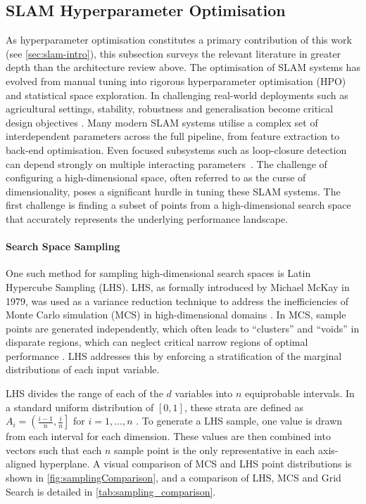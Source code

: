 \subsection{SLAM Hyperparameter Optimisation}
\label{subsec:slam-hyperparameter}
As hyperparameter optimisation constitutes a primary contribution of this work (see \cref{sec:slam-intro}), this subsection surveys the relevant literature in greater depth than the architecture review above.
The optimisation of SLAM systems has evolved from manual tuning into rigorous hyperparameter optimisation (HPO) and statistical space exploration. In challenging real-world deployments such as agricultural settings, stability, robustness and generalisation become critical design objectives \cite{khanReviewSLAMTechniques2025}. Many modern SLAM systems utilise a complex set of interdependent parameters across the full pipeline, from feature extraction to back-end optimisation. Even focused subsystems such as loop-closure detection can depend strongly on multiple interacting parameters~\cite{hanMultiObjectiveOptimizationLoop2020}. The challenge of configuring a high-dimensional space, often referred to as the curse of dimensionality, poses a significant hurdle in tuning these SLAM systems. The first challenge is finding a subset of points from a high-dimensional search space that accurately represents the underlying performance landscape. 

\paragraph{Search Space Sampling}
One such method for sampling high-dimensional search spaces is Latin Hypercube Sampling (LHS). LHS, as formally introduced by Michael McKay in 1979, was used as a variance reduction technique to address the inefficiencies of Monte Carlo simulation (MCS) in high-dimensional domains \cite{chrismanLatinHypercubeSampling2014}. In MCS, sample points are generated independently, which often leads to ``clusters'' and ``voids'' in disparate regions, which can neglect critical narrow regions of optimal performance \cite{deutschLatinHypercubeSampling2012}. LHS addresses this by enforcing a stratification of the marginal distributions of each input variable.

LHS divides the range of each of the $d$ variables into $n$ equiprobable intervals. In a standard uniform distribution of $[0, 1]$, these strata are defined as $A_i = \left( \frac{i-1}{n}, \frac{i}{n} \right]$ for $i = 1, \dots, n$ \cite{chrismanLatinHypercubeSampling2014}. To generate a LHS sample, one value is drawn from each interval for each dimension. These values are then combined into vectors such that
each $n$ sample point is the only representative in each axis-aligned hyperplane. A visual comparison of MCS and LHS point distributions is shown in \cref{fig:samplingComparison}, and a comparison of LHS, MCS and Grid Search is detailed in \cref{tab:sampling_comparison}.

